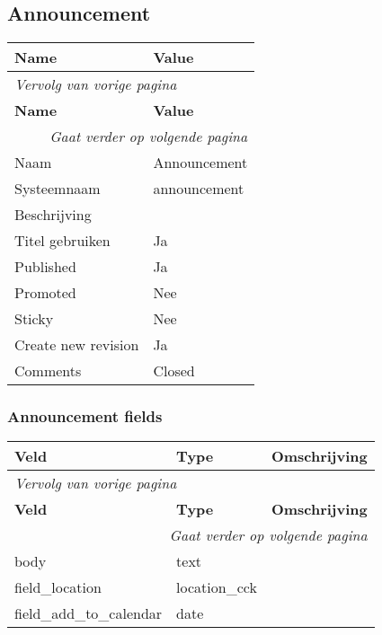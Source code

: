 \subsection{Announcement}
\label{sec:content-announcement}
  \begin{longtable}{| p{7.50cm}|p{7.50cm}|}
  \hline
  \rowcolor{tableheader}
  \textbf{Name} & \textbf{Value}  \tabularnewline
  \hline
\endfirsthead
\multicolumn{2}{l}{\textit{Vervolg van vorige pagina}} \\
\hline
\rowcolor{tableheader}
  \textbf{Name} & \textbf{Value}  \tabularnewline
  \hline
\hline
\endhead
\multicolumn{2}{r}{\textit{Gaat verder op volgende pagina}} \\
\endfoot
\hline
\endlastfoot
  Naam & Announcement  \tabularnewline
  \hline
  Systeemnaam & announcement  \tabularnewline
  \hline
  Beschrijving &   \tabularnewline
  \hline
  Titel gebruiken & Ja  \tabularnewline
  \hline
  Published & Ja  \tabularnewline
  \hline
  Promoted & Nee  \tabularnewline
  \hline
  Sticky & Nee  \tabularnewline
  \hline
  Create new revision & Ja  \tabularnewline
  \hline
  Comments & Closed  \tabularnewline
  \hline
  \end{longtable}

\subsubsection{Announcement fields}
  \begin{longtable}{| p{5.00cm}|p{5.00cm}|p{5.00cm}|}
  \hline
  \rowcolor{tableheader}
  \textbf{Veld} & \textbf{Type} & \textbf{Omschrijving}  \tabularnewline
  \hline
\endfirsthead
\multicolumn{3}{l}{\textit{Vervolg van vorige pagina}} \\
\hline
\rowcolor{tableheader}
  \textbf{Veld} & \textbf{Type} & \textbf{Omschrijving}  \tabularnewline
  \hline
\hline
\endhead
\multicolumn{3}{r}{\textit{Gaat verder op volgende pagina}} \\
\endfoot
\hline
\endlastfoot
  body & text &   \tabularnewline
  \hline
  field\_location & location\_cck &   \tabularnewline
  \hline
  field\_add\_to\_calendar & date &   \tabularnewline
  \hline
  \end{longtable}


